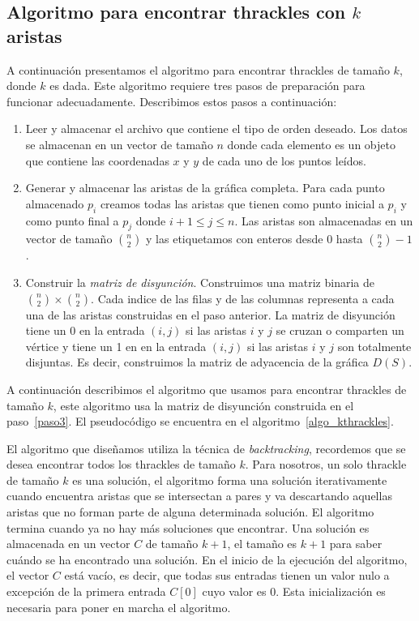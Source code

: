 \subsection{Algoritmo para encontrar thrackles con $k$
  aristas}\label{seccion_algoritmo_kthrackles}
  A continuación presentamos el algoritmo para encontrar thrackles de tamaño
  $k$, donde $k$ es dada. Este algoritmo requiere tres pasos de preparación para funcionar adecuadamente. Describimos estos pasos a continuación:
  \begin{enumerate}
    \item Leer y almacenar el archivo que contiene el tipo de orden deseado.
    Los datos se almacenan en un vector de tamaño $n$ donde cada elemento es
    un objeto que contiene las coordenadas $x$ y $y$ de cada uno de los puntos
    leídos.
    \item Generar y almacenar las aristas de la gráfica completa.
    Para cada punto almacenado $p_i$ creamos todas las aristas que tienen como punto inicial a $p_i$ y como punto final a $p_j$ donde $ i+1 \leq j \leq n$.
    Las aristas son almacenadas en un vector de tamaño $\binom{n}{2}$ y las etiquetamos con enteros desde $0$ hasta $\binom{n}{2}-1$.
    \item \label{paso3}Construir la \emph{matriz de disyunción}.
    Construimos una matriz binaria de $\binom{n}{2}\times \binom{n}{2}$. Cada
    indice de las filas y de las columnas representa a cada una de las aristas construidas en el paso anterior. La matriz de disyunción tiene un 0 en la entrada $(i,j)$ si las aristas $i$ y $j$ se cruzan o comparten un vértice y tiene un 1 en en la entrada $(i,j)$ si las aristas $i$ y $j$ son totalmente disjuntas. Es decir, construimos la matriz de adyacencia de la gráfica $D(S)$.
  \end{enumerate}

  A continuación describimos el algoritmo que usamos para encontrar thrackles
  de tamaño $k$, este algoritmo usa la matriz de disyunción construida en el
  paso~\ref{paso3}. El pseudocódigo se encuentra en el
  algoritmo~\ref{algo_kthrackles}.

  El algoritmo que diseñamos utiliza la técnica de \emph{backtracking},
  recordemos que se desea encontrar todos los thrackles de tamaño $k$. Para
  nosotros, un solo thrackle de tamaño $k$ es una solución, el algoritmo forma
  una solución iterativamente cuando encuentra aristas que se intersectan a
  pares y va descartando aquellas aristas que no forman parte de alguna
  determinada solución. El algoritmo termina cuando ya no hay más soluciones
  que encontrar. Una solución es almacenada en un vector $C$ de tamaño $k+1$,
  el tamaño es $k+1$ para saber cuándo se ha encontrado una solución. En el
  inicio de la ejecución del algoritmo, el vector $C$ está vacío, es decir, que
  todas sus entradas tienen un valor nulo a excepción de la primera entrada
  $C[0]$ cuyo valor es 0. Esta inicialización es necesaria para poner en marcha
  el algoritmo.

